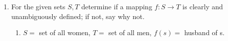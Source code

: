 \renewcommand{\theequation}{\theenumi}

\begin{enumerate}[label=\arabic*.,ref=\thesubsection.\theenumi]

	\item For the given sets $S, T$ determine if a mapping $f:S\to T$ is clearly and unambiguously defined; if not, say why not.
\begin{enumerate}
	\item $S =$ set of all women, $T = $ set of all men, $f(s) = $ husband of s.
\end{enumerate}
\end{enumerate}
